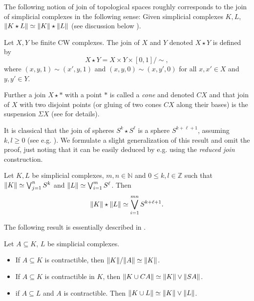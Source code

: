 \documentclass[a4paper, v2021]{lipics-v2021}
\theoremstyle{plain}
\theoremstyle{definition}
\DeclarePairedDelimiter{\gr}{\lVert}{\rVert}
\begin{document}
The following notion of join of topological spaces roughly corresponds to the join of simplicial complexes in the following sense: Given simplicial complexes $K,L$, $\gr{K\star L} \simeq \gr{K}\star \gr{L}$ (see discussion below \cite[Proposition~4.2.4]{matousek2003}).
\begin{definition}
Let $X,Y$ be finite CW complexes. The join of $X$ and $Y$ denoted $X\star Y$ is defined by
\[
X \star Y = X \times Y \times [0,1]/\sim,
\] where $(x,y,1) \sim (x',y,1)$ and $(x,y,0) \sim (x,y',0)$ for all $x,x' \in X $ and $y,y' \in Y$.

\end{definition}
Further a join $X \star *$ with a point $*$ is called a \emph{cone} and denoted $CX$ and that join of $X$ with two disjoint points (or gluing of two cones $CX$ along their bases) is the suspension $\Sigma X$ (see \cite[Chapter~0]{Hatcher2002} for details).

It is classical that the join of spheres $S^k \star S^\ell$ is a sphere $S^{k + \ell + 1}$, assuming $k,l\geq 0$ (see e.g. \cite[Example~4.2.2]{matousek2003}). We formulate a slight generalization of this result and omit the proof, just noting that it can be easily deduced by e.g. using the \emph{reduced join} construction.

\begin{lemma}\label{l:joinSpheres}
Let $K, L$ be simplicial complexes, $m,n \in \mathbb{N}$ and $0\leq k,l \in \mathbb{Z}$ such that $\gr{K} \simeq \bigvee_{j=1}^n S^k$ and $\gr{L} \simeq \bigvee_{i=1}^m S^\ell$. Then
\[
\gr{K} \star \gr{L} \simeq \bigvee_{i=1}^{mn} S^{k + \ell + 1}.
\]
\end{lemma}


The following result is essentially described in \cite[Example~0.14 and Example 0.13]{Hatcher2002}.
\begin{lemma}\label{l:contraction}\label{l:contractionSuspension}
Let $A\subseteq K$, $L$ be simplicial complexes.
\begin{itemize}
    \item If $A\subseteq K$ is contractible, then $\gr{K}/\gr{A}\simeq \gr{K}$.
    \item If $A\subseteq K$ is contractible in $K$, then $\gr{K \cup CA}\simeq \gr{K} \vee \gr{SA}$.
    \item if $A\subseteq L $ and $A$ is contractible. Then $\gr{K \cup L}\simeq \gr{K} \vee \gr{L}$.
\end{itemize}
\end{lemma}
\end{document}
